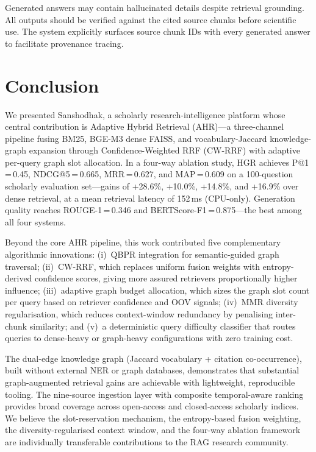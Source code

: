 \documentclass[journal]{IEEEtran}
\begin{document}
Generated answers may contain hallucinated details despite
retrieval grounding. All outputs should be verified against
the cited source chunks before scientific use. The system
explicitly surfaces source chunk IDs with every generated answer
to facilitate provenance tracing.

\section{Conclusion}
\label{sec:conclusion}

We presented Sanshodhak, a scholarly research-intelligence platform
whose central contribution is Adaptive Hybrid Retrieval (AHR)---a
three-channel pipeline fusing BM25, BGE-M3 dense FAISS, and
vocabulary-Jaccard knowledge-graph expansion through Confidence-Weighted
RRF (CW-RRF) with adaptive per-query graph slot allocation. In a
four-way ablation study, HGR achieves P@1\,=\,0.45, NDCG@5\,=\,0.665,
MRR\,=\,0.627, and MAP\,=\,0.609 on a 100-question scholarly
evaluation set---gains of +28.6\%, +10.0\%, +14.8\%, and +16.9\%
over dense retrieval, at a mean retrieval latency of 152\,ms (CPU-only).
Generation quality reaches ROUGE-1\,=\,0.346 and
BERTScore-F1\,=\,0.875---the best among all four systems.

Beyond the core AHR pipeline, this work contributed five
complementary algorithmic innovations:
(i)~QBPR integration for semantic-guided graph traversal;
(ii)~CW-RRF, which replaces uniform fusion weights with
entropy-derived confidence scores, giving more assured retrievers
proportionally higher influence;
(iii)~adaptive graph budget allocation, which sizes the graph
slot count per query based on retriever confidence and OOV signals;
(iv)~MMR diversity regularisation, which reduces context-window
redundancy by penalising inter-chunk similarity;
and (v)~a deterministic query difficulty classifier that routes
queries to dense-heavy or graph-heavy configurations with zero
training cost.

The dual-edge knowledge graph (Jaccard vocabulary + citation
co-occurrence), built without external NER or graph databases,
demonstrates that substantial graph-augmented retrieval gains are
achievable with lightweight, reproducible tooling. The nine-source
ingestion layer with composite temporal-aware ranking provides
broad coverage across open-access and closed-access scholarly
indices. We believe the slot-reservation mechanism, the entropy-based
fusion weighting, the diversity-regularised context window, and the
four-way ablation framework are individually transferable
contributions to the RAG research community.
\end{document}
